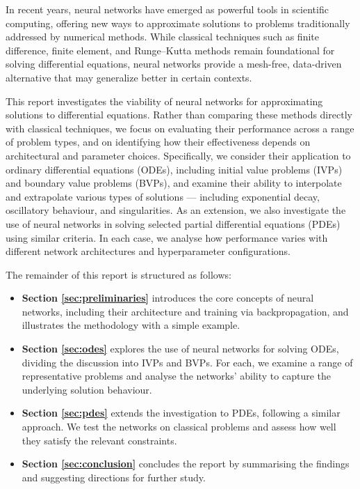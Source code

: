 In recent years, neural networks have emerged as powerful tools in scientific computing, 
offering new ways to approximate solutions to problems traditionally addressed by numerical methods. 
While classical techniques such as finite difference, finite element, and Runge–Kutta methods remain 
foundational for solving differential equations, neural networks provide a mesh-free, 
data-driven alternative that may generalize better in certain contexts.

This report investigates the viability of neural networks for approximating solutions to 
differential equations. Rather than comparing these methods directly with classical techniques, 
we focus on evaluating their performance across a range of problem types, and on identifying 
how their effectiveness depends on architectural and parameter choices. Specifically, we consider 
their application to ordinary differential equations (ODEs), including initial value problems (IVPs) 
and boundary value problems (BVPs), and examine their ability to interpolate and extrapolate 
various types of solutions — including exponential decay, oscillatory behaviour, and singularities. 
As an extension, we also investigate the use of neural networks in solving selected partial 
differential equations (PDEs) using similar criteria. In each case, we analyse how performance varies 
with different network architectures and hyperparameter configurations.

The remainder of this report is structured as follows:

\begin{itemize}
    \item \textbf{Section \ref{sec:preliminaries}} introduces the core concepts of neural networks, 
    including their architecture and training via backpropagation, and illustrates the methodology 
    with a simple example.
    
    \item \textbf{Section \ref{sec:odes}} explores the use of neural networks for solving ODEs, 
    dividing the discussion into IVPs and BVPs. For each, we examine a range of representative problems 
    and analyse the networks' ability to capture the underlying solution behaviour.
    
    \item \textbf{Section \ref{sec:pdes}} extends the investigation to PDEs, following a similar approach. 
    We test the networks on classical problems and assess how well they satisfy the relevant constraints.
    
    \item \textbf{Section \ref{sec:conclusion}} concludes the report by summarising the findings and 
    suggesting directions for further study.
\end{itemize}
